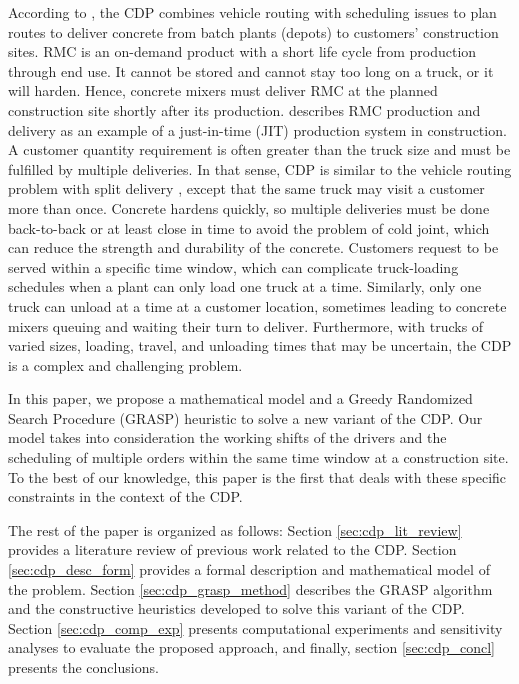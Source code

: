 According to \cite{blazewicz2019handbook}, the CDP combines vehicle routing with scheduling issues to plan routes to deliver concrete from batch plants (depots) to customers' construction sites. RMC is an on-demand product with a short life cycle from production through end use. It cannot be stored and cannot stay too long on a truck, or it will harden. Hence, concrete mixers must deliver RMC at the planned construction site shortly after its production. \cite{tommelein1999just} describes RMC production and delivery as an example of a just-in-time (JIT) production system in construction. A customer quantity requirement is often greater than the truck size and must be fulfilled by multiple deliveries. In that sense, CDP is similar to the vehicle routing problem with split delivery \citep{archetti2008split}, except that the same truck may visit a customer more than once. Concrete hardens quickly, so multiple deliveries must be done back-to-back or at least close in time to avoid the problem of cold joint, which can reduce the strength and durability of the concrete. Customers request to be served within a specific time window, which can complicate truck-loading schedules when a plant can only load one truck at a time. Similarly, only one truck can unload at a time at a customer location, sometimes leading to concrete mixers queuing and waiting their turn to deliver. Furthermore, with trucks of varied sizes, loading, travel, and unloading times that may be uncertain, the CDP is a complex and challenging problem.

In this paper, we propose a mathematical model and a Greedy Randomized Search Procedure (GRASP) heuristic to solve a new variant of the CDP. Our model takes into consideration the working shifts of the drivers and the scheduling of multiple orders within the same time window at a construction site. To the best of our knowledge, this paper is the first that deals with these specific constraints in the context of the CDP.

The rest of the paper is organized as follows: Section \ref{sec:cdp_lit_review} provides a literature review of previous work related to the CDP. Section \ref{sec:cdp_desc_form} provides a formal description and mathematical model of the problem. Section \ref{sec:cdp_grasp_method} describes the GRASP algorithm and the constructive heuristics developed to solve this variant of the CDP. Section \ref{sec:cdp_comp_exp} presents computational experiments and sensitivity analyses to evaluate the proposed approach, and finally, section \ref{sec:cdp_concl} presents the conclusions.

